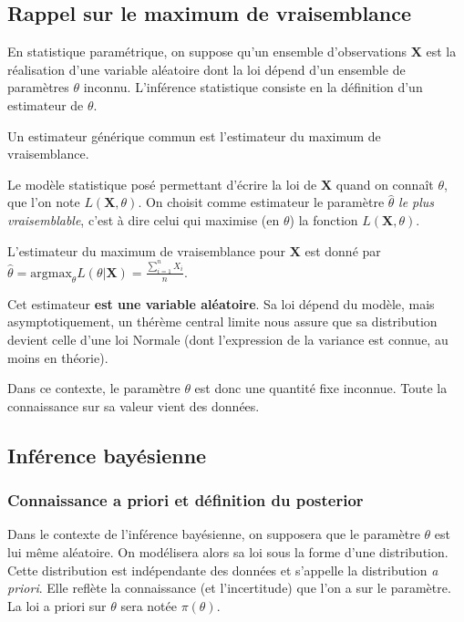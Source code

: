 \subsection{Rappel sur le maximum de vraisemblance}

En statistique paramétrique, on suppose qu'un ensemble d'observations $\mathbf{X}$ est la réalisation d'une variable aléatoire dont la loi dépend d'un ensemble de paramètres $\theta$ inconnu. 
L'inférence statistique consiste en la définition d'un estimateur de $\theta$.

Un estimateur générique commun est l'estimateur du maximum de vraisemblance. 

Le modèle statistique posé permettant d'écrire la loi de $\mathbf{X}$ quand on connaît $\theta$, que l'on note $L(\mathbf{X}, \theta)$. 
On choisit comme estimateur le paramètre $\hat{\theta}$ \textit{le plus vraisemblable}, c'est à dire celui qui maximise (en $\theta$) la fonction $L(\mathbf{X}, \theta)$.

L'estimateur du maximum de vraisemblance pour \(\mathbf{X}\) est donné
par
\(\hat{\theta} = \text{argmax}_{\theta}L(\theta\vert \mathbf{X}) = \frac{\sum_{i=1}^n X_i}{n}\).

Cet estimateur \textbf{est une variable aléatoire}. Sa loi dépend du modèle, mais 
asymptotiquement, un thérème central limite nous assure que sa distribution devient celle d'une loi Normale (dont l'expression de la variance est connue, au moins en théorie).

Dans ce contexte, le paramètre $\theta$ est donc une quantité fixe inconnue. Toute la connaissance sur sa valeur vient des données.

\subsection{Inférence bayésienne}

\subsubsection{Connaissance a priori et définition du posterior}

Dans le contexte de l'inférence bayésienne, on supposera que le paramètre $\theta$ est lui même aléatoire.
On modélisera alors sa loi sous la forme d'une distribution. Cette distribution est indépendante des données et s'appelle la distribution \textit{a priori}. 
Elle reflète la connaissance (et l'incertitude) que l'on a sur le paramètre.
La loi a priori sur $\theta$ sera notée  $\pi(\theta)$.

